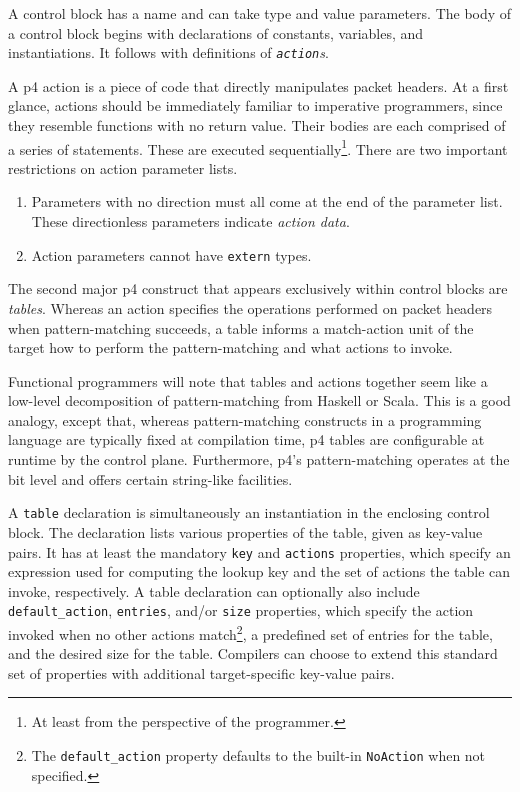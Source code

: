 A control block has a name and can take type and value parameters. The body of a
control block begins with declarations of constants, variables, and
instantiations. It follows with definitions of \emph{\texttt{action}s}.

A \acrshort{p4} action is a piece of code that directly
manipulates packet headers. At a first glance, actions should be immediately
familiar to imperative programmers, since they resemble functions with no return
value. Their bodies are each comprised of a series of statements. These are
executed sequentially\footnote{At least from the perspective of the
programmer.}. There are two important restrictions on action parameter lists.

\begin{enumerate}
	\item Parameters with no direction must all come at the end of the parameter
	list. These directionless parameters indicate \emph{action
	data}.
	\item Action parameters cannot have \texttt{extern} types.
\end{enumerate}

The second major \acrshort{p4} construct that appears exclusively
within control blocks are \emph{tables}. Whereas an action specifies the
operations performed on packet headers when pattern-matching succeeds, a table
informs a match-action unit of the target how to perform the pattern-matching
and what actions to invoke.

Functional programmers will note that tables and actions together seem like a
low-level decomposition of pattern-matching from Haskell or Scala. This is a
good analogy, except that, whereas pattern-matching constructs in a programming
language are typically fixed at compilation time, \acrshort{p4} tables are
configurable at runtime by the control plane. Furthermore, \acrshort{p4}'s
pattern-matching operates at the bit level and offers certain string-like
facilities.

A \texttt{table} declaration is simultaneously an instantiation in the enclosing
control block. The declaration lists various properties of the table, given as
key-value pairs. It has at least the mandatory \texttt{key} and \texttt{actions}
properties, which specify an expression used for computing the lookup key and
the set of actions the table can invoke, respectively. A table declaration can
optionally also include \texttt{default\_action}, \texttt{entries}, and/or
\texttt{size} properties, which specify the action invoked when no other actions
match\footnote{The \texttt{default\_action} property defaults to the built-in
\texttt{NoAction} when not specified.}, a predefined set of entries for the
table, and the desired size for the table. Compilers can choose to extend this
standard set of properties with additional target-specific key-value pairs.

